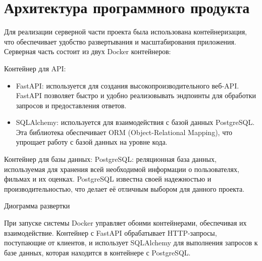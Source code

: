 \section{Архитектура программного продукта}

Для реализации серверной части проекта была использована контейнеризация, что обеспечивает удобство развертывания
и масштабирования приложения.
Серверная часть состоит из двух Docker контейнеров:

Контейнер для API:
\begin{itemize}
    \item FastAPI: используется для создания высокопроизводительного веб-API. FastAPI позволяет быстро и удобно реализовывать эндпоинты для обработки запросов и предоставления ответов.
    \item SQLAlchemy: используется для взаимодействия с базой данных PostgreSQL. Эта библиотека обеспечивает ORM (Object-Relational Mapping), что упрощает работу с базой данных на уровне кода.
\end{itemize}

Контейнер для базы данных: PostgreSQL: реляционная база данных, используемая для хранения всей необходимой
информации о пользователях, фильмах и их оценках.
PostgreSQL известна своей надежностью и производительностью, что делает её отличным выбором для данного проекта.


\begin{image}
    \caption{Диограмма развертки}
    \label{fig:deploy}
\end{image}
При запуске системы Docker управляет обоими контейнерами, обеспечивая их взаимодействие.
Контейнер с FastAPI обрабатывает HTTP-запросы, поступающие от клиентов, и использует SQLAlchemy для выполнения
запросов к базе данных, которая находится в контейнере с PostgreSQL.
